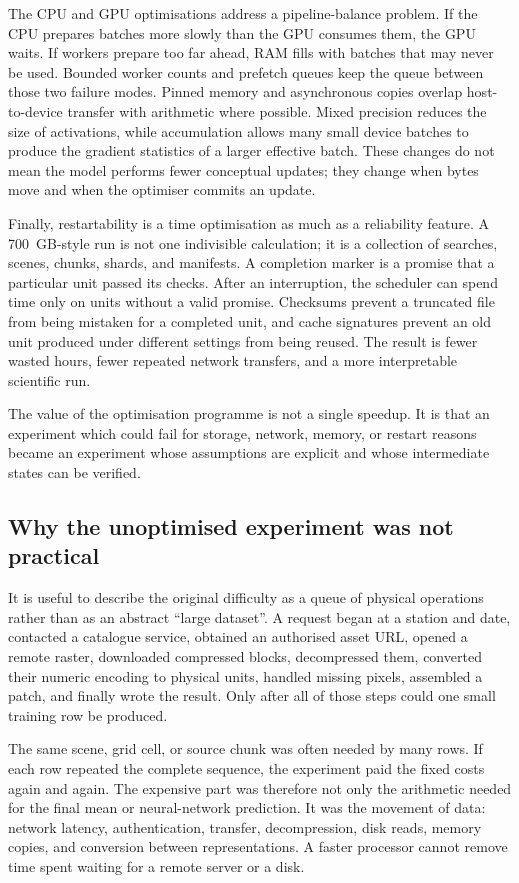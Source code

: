\documentclass[12pt,a4paper]{report}
\newcommand{\feat}[1]{#1\par}
\begin{document}
The CPU and GPU optimisations address a pipeline-balance problem. If the CPU
prepares batches more slowly than the GPU consumes them, the GPU waits. If
workers prepare too far ahead, RAM fills with batches that may never be used.
Bounded worker counts and prefetch queues keep the queue between those two
failure modes. Pinned memory and asynchronous copies overlap host-to-device
transfer with arithmetic where possible. Mixed precision reduces the size of
activations, while accumulation allows many small device batches to produce the
gradient statistics of a larger effective batch. These changes do not mean the
model performs fewer conceptual updates; they change when bytes move and when
the optimiser commits an update.

Finally, restartability is a time optimisation as much as a reliability
feature. A 700~GB-style run is not one indivisible calculation; it is a
collection of searches, scenes, chunks, shards, and manifests. A completion
marker is a promise that a particular unit passed its checks. After an
interruption, the scheduler can spend time only on units without a valid
promise. Checksums prevent a truncated file from being mistaken for a completed
unit, and cache signatures prevent an old unit produced under different
settings from being reused. The result is fewer wasted hours, fewer repeated
network transfers, and a more interpretable scientific run.

\feat{The value of the optimisation programme is not a single speedup. It is
that an experiment which could fail for storage, network, memory, or restart
reasons became an experiment whose assumptions are explicit and whose
intermediate states can be verified.}

\subsection{Why the unoptimised experiment was not practical}
It is useful to describe the original difficulty as a queue of physical
operations rather than as an abstract ``large dataset''. A request began at a
station and date, contacted a catalogue service, obtained an authorised asset
URL, opened a remote raster, downloaded compressed blocks, decompressed them,
converted their numeric encoding to physical units, handled missing pixels,
assembled a patch, and finally wrote the result. Only after all of those steps
could one small training row be produced.

The same scene, grid cell, or source chunk was often needed by many rows. If
each row repeated the complete sequence, the experiment paid the fixed costs
again and again. The expensive part was therefore not only the arithmetic
needed for the final mean or neural-network prediction. It was the movement of
data: network latency, authentication, transfer, decompression, disk reads,
memory copies, and conversion between representations. A faster processor
cannot remove time spent waiting for a remote server or a disk.
\end{document}
